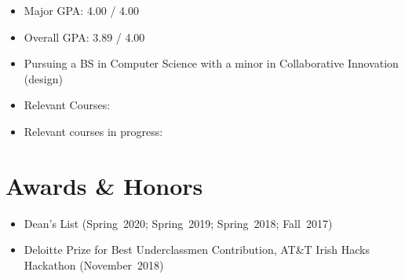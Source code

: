 \documentclass[letterpaper,10pt]{article}
\begin{document}
\begin{minipage}[t]{\dimexpr.33\textwidth-.5\columnsep}
\begin{flushleft}
\begin{itemize}
    \item Major GPA: 4.00 / 4.00
    \item Overall GPA: 3.89 / 4.00
    \item Pursuing a BS in Computer Science with a minor in Collaborative Innovation (design)
    \item Relevant Courses:
    \item Relevant courses in progress:
\end{itemize}

\section[Awards and Honors]{Awards \& Honors}
\begin{itemize}
    \item Dean’s List (Spring~2020; Spring~2019; Spring~2018; Fall~2017)
    \item Deloitte Prize for Best Underclassmen Contribution, AT\&T Irish Hacks Hackathon (November~2018)
\end{itemize}


\end{flushleft}
\end{minipage}
\end{document}
